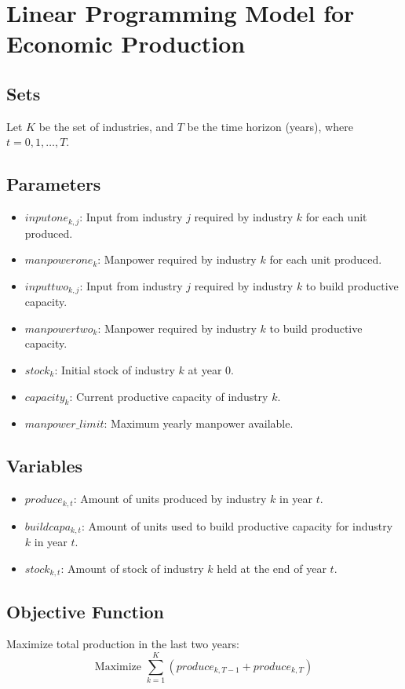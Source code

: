 \documentclass{article}
\begin{document}
\section*{Linear Programming Model for Economic Production}

\subsection*{Sets}
Let $K$ be the set of industries, and $T$ be the time horizon (years), where $t = 0, 1, \ldots, T$.

\subsection*{Parameters}
\begin{itemize}
    \item $inputone_{k,j}$: Input from industry $j$ required by industry $k$ for each unit produced.
    \item $manpowerone_{k}$: Manpower required by industry $k$ for each unit produced.
    \item $inputtwo_{k,j}$: Input from industry $j$ required by industry $k$ to build productive capacity.
    \item $manpowertwo_{k}$: Manpower required by industry $k$ to build productive capacity.
    \item $stock_{k}$: Initial stock of industry $k$ at year $0$.
    \item $capacity_{k}$: Current productive capacity of industry $k$.
    \item $manpower\_limit$: Maximum yearly manpower available.
\end{itemize}

\subsection*{Variables}
\begin{itemize}
    \item $produce_{k,t}$: Amount of units produced by industry $k$ in year $t$.
    \item $buildcapa_{k,t}$: Amount of units used to build productive capacity for industry $k$ in year $t$.
    \item $stock_{k,t}$: Amount of stock of industry $k$ held at the end of year $t$.
\end{itemize}

\subsection*{Objective Function}
Maximize total production in the last two years:
\[
\text{Maximize } \sum_{k=1}^{K} \left( produce_{k,T-1} + produce_{k,T} \right)
\]
\end{document}
